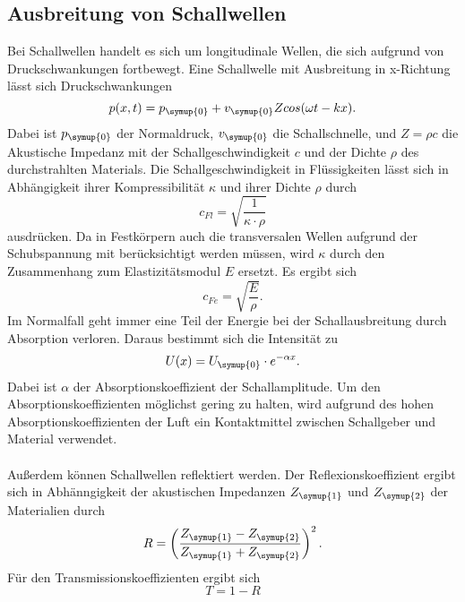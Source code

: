 \subsection{Ausbreitung von Schallwellen}
\label{sec:Schallwellen}
Bei Schallwellen handelt es sich um longitudinale Wellen, die sich aufgrund von Druckschwankungen fortbewegt.
Eine Schallwelle mit Ausbreitung in x-Richtung lässt sich Druckschwankungen
\begin{equation*}
    p(x, t) = p_{\symup{0}} + v_{\symup{0}} Z cos(\omega t - kx).
\end{equation*}
Dabei ist $p_{\symup{0}}$ der Normaldruck, $v_{\symup{0}}$ die Schallschnelle, und $Z=\rho c$ die Akustische
Impedanz mit der Schallgeschwindigkeit $c$ und der Dichte $\rho$ des durchstrahlten Materials.
Die Schallgeschwindigkeit in Flüssigkeiten lässt sich in Abhängigkeit ihrer Kompressibilität $\kappa$ und ihrer
Dichte $\rho$ durch
\begin{equation*}
    c_{Fl} = \sqrt{\frac{1}{\kappa \cdot \rho}}
\end{equation*}
ausdrücken. Da in Festkörpern auch die transversalen Wellen aufgrund der Schubspannung mit berücksichtigt werden
müssen, wird $\kappa$ durch den Zusammenhang zum Elastizitätsmodul $E$ ersetzt. Es ergibt sich
\begin{equation*}
    c_{Fe} = \sqrt{\frac{E}{\rho}}.
\end{equation*}
Im Normalfall geht immer eine Teil der Energie bei der Schallausbreitung durch Absorption verloren. Daraus bestimmt
sich die Intensität zu
\begin{equation}
    \label{eqn:Dämpfung}
    U(x) = U_{\symup{0}}\cdot e^{-\alpha x}.
\end{equation}
Dabei ist $\alpha$ der Absorptionskoeffizient der Schallamplitude. Um den Absorptionskoeffizienten möglichst
gering zu halten, wird aufgrund des hohen Absorptionskoeffizienten der Luft ein Kontaktmittel zwischen Schallgeber
und Material verwendet.\\
\\
Außerdem können Schallwellen reflektiert werden. Der Reflexionskoeffizient ergibt sich in Abhänngigkeit der
akustischen Impedanzen $Z_{\symup{1}}$ und $Z_{\symup{2}}$ der Materialien durch
\begin{equation*}
    R = \left(\frac{Z_{\symup{1}}- Z_{\symup{2}}}{Z_{\symup{1}}+Z_{\symup{2}}}\right)^2 .
\end{equation*}
Für den Transmissionskoeffizienten ergibt sich
\begin{equation*}
    T = 1 - R
\end{equation*}

